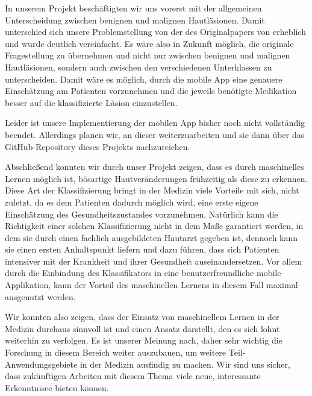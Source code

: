 In unserem Projekt beschäftigten wir uns vorerst mit der allgemeinen Unterscheidung zwischen benignen und malignen Hautläsionen. Damit unterschied sich unsere Problemstellung von der des Originalpapers von \citet{esteva2017dermatologist} erheblich und wurde deutlich vereinfacht. Es wäre also in Zukunft möglich, die originale Fragestellung zu übernehmen und nicht nur zwischen benignen und malignen Hautläsionen, sondern auch zwischen den verschiedenen Unterklassen zu unterscheiden. Damit wäre es möglich, durch die mobile App eine genauere Einschätzung am Patienten vorzunehmen und die jeweils benötigte Medikation besser auf die klassifizierte Läsion einzustellen.

Leider ist unsere Implementierung der mobilen App bisher noch nicht vollständig beendet. Allerdings planen wir, an dieser weiterzuarbeiten und sie dann über das GitHub-Repository dieses Projekts nachzureichen.  

Abschließend konnten wir durch unser Projekt zeigen, dass es durch maschinelles Lernen möglich ist, bösartige Hautveränderungen frühzeitig als diese zu erkennen. Diese Art der Klassifizierung bringt in der Medizin viele Vorteile mit sich, nicht zuletzt, da es dem Patienten dadurch möglich wird, eine erste eigene Einschätzung des Gesundheitszustandes vorzunehmen. Natürlich kann die Richtigkeit einer solchen Klassifizierung nicht in dem Maße garantiert werden, in dem sie durch einen fachlich ausgebildeten Hautarzt gegeben ist, dennoch kann sie einen ersten Anhaltspunkt liefern und dazu führen, dass sich Patienten intensiver mit der Krankheit und ihrer Gesundheit auseinandersetzen. Vor allem durch die Einbindung des Klassifikators in eine benutzerfreundliche mobile Applikation, kann der Vorteil des maschinellen Lernens in diesem Fall maximal ausgenutzt werden.

Wir konnten also zeigen, dass der Einsatz von maschinellem Lernen in der Medizin durchaus sinnvoll ist und einen Ansatz darstellt, den es sich lohnt weiterhin zu verfolgen. Es ist unserer Meinung nach, daher sehr wichtig die Forschung in diesem Bereich weiter auszubauen, um weitere Teil-Anwendungsgebiete in der Medizin ausfindig zu machen. Wir sind uns sicher, dass zukünftigen Arbeiten mit diesem Thema viele neue, interessante Erkenntnisee bieten können.    